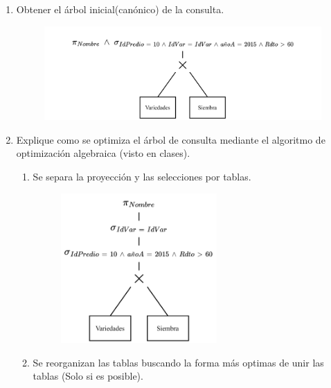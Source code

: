 \documentclass{templateNote}
\begin{document}
\begin{enumerate}
\begin{enumerate}
        \item Obtener el árbol inicial(canónico) de la consulta.
        \begin{figure}[H]
            \centering
            \includegraphics[width=\textwidth]{img/E2-ArbolCanonico.png}
        \end{figure}

        \newpage
        \item Explique como se optimiza el árbol de consulta mediante el algoritmo de optimización algebraica (visto en clases).
        \begin{enumerate}
            \item Se separa la proyección y las selecciones por tablas.
            \begin{figure}[H]
                \centering
                \includegraphics[width=0.6\textwidth]{img/E2-Paso1.png}
            \end{figure}

            \item Se reorganizan las tablas buscando la forma más optimas de unir las tablas (Solo si es posible).


\end{enumerate}
\end{enumerate}
\end{enumerate}
\end{document}
